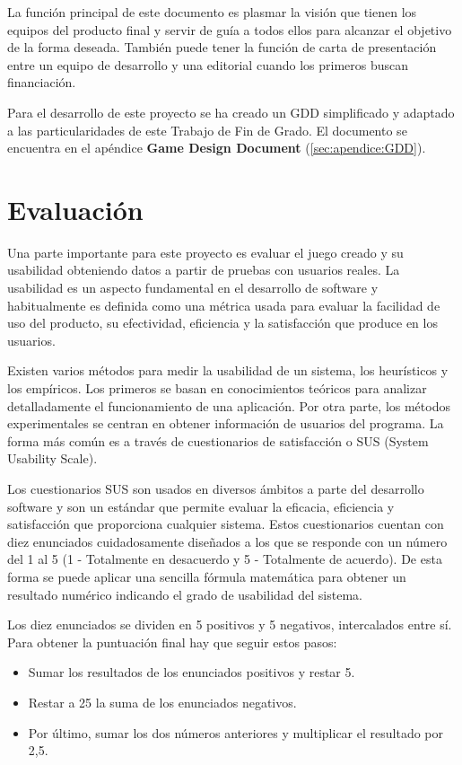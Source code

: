 La función principal de este documento es plasmar la visión que tienen los equipos del producto final y servir de guía a todos ellos para alcanzar el objetivo de la forma deseada. También puede tener la función de carta de presentación entre un equipo de desarrollo y una editorial cuando los primeros buscan financiación.

Para el desarrollo de este proyecto se ha creado un GDD simplificado y adaptado a las particularidades de este Trabajo de Fin de Grado. El documento se encuentra en el apéndice \textbf{Game Design Document} (\ref{sec:apendice:GDD}).

\section{Evaluación}
\label{sec:evaluacion}

Una parte importante para este proyecto es evaluar el juego creado y su usabilidad obteniendo datos a partir de pruebas con usuarios reales. La usabilidad es un aspecto fundamental en el desarrollo de software y habitualmente es definida como una métrica usada para evaluar la facilidad de uso del producto, su efectividad, eficiencia y la satisfacción que produce en los usuarios. \cite{MU_eval_usabilidad}

Existen varios métodos para medir la usabilidad de un sistema, los heurísticos y los empíricos. Los primeros se basan en conocimientos teóricos para analizar detalladamente el funcionamiento de una aplicación. Por otra parte, los métodos experimentales se centran en obtener información de usuarios del programa. La forma más común es a través de cuestionarios de satisfacción o SUS (System Usability Scale).

Los cuestionarios SUS son usados en diversos ámbitos a parte del desarrollo software y son un estándar que permite evaluar la eficacia, eficiencia y satisfacción que proporciona cualquier sistema. Estos cuestionarios cuentan con diez enunciados cuidadosamente diseñados a los que se responde con un número del 1 al 5 (1 - Totalmente en desacuerdo y 5 - Totalmente de acuerdo). De esta forma se puede aplicar una sencilla fórmula matemática para obtener un resultado numérico indicando el grado de usabilidad del sistema. \cite{MU_eval_sus}

Los diez enunciados se dividen en 5 positivos y 5 negativos, intercalados entre sí. Para obtener la puntuación final hay que seguir estos pasos:


\begin{itemize}
	\item{Sumar los resultados de los enunciados positivos y restar 5.}
	
	\item{Restar a 25 la suma de los enunciados negativos.}
	
	\item{Por último, sumar los dos números anteriores y multiplicar el resultado por 2,5.}

\end{itemize}


